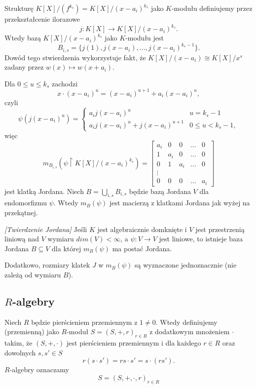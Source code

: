 Strukturę $K[X]/(f^{k_s})=K[X]/(x-a_i)^{k_s}$ jako $K$-modułu definiujemy przez przekształcenie ilorazowe
$$j:K[X]\to K[X]/(x-a_i)^{k_s}.$$
Wtedy bazą $K[X]/(x-a_i)^{k_s}$ jako $K$-modułu jest
$$B_{i,s}=\{j(1),j(x-a_i),...,j(x-a_i)^{k_s-1}\}.$$
Dowód tego stwierdzenia wykorzystuje fakt, że $K[X]/(x-a_i)\cong K[X]/x^s$ zadany przez $w(x)\mapsto w(x+a_i)$.

Dla $0\leq u\leq k_s$ zachodzi
$$x\cdot(x-a_i)^u=(x-a_i)^{u+1}+a_i(x-a_i)^u,$$
czyli
$$
\psi(j(x-a_i)^u)=\begin{cases}a_ij(x-a_i)^u & u=k_s-1\\a_ij(x-a_i)^u+j(x-a_i)^{u+1}&0\leq u < k_s-1,\end{cases}
$$
więc
$$m_{B_{i,s}}(\psi\restriction K[X]/(x-a_i)^{k_s})=\begin{bmatrix}a_i & 0 & 0 & \hdots & 0\\
    1 & a_i & 0 & \hdots & 0\\
    0 & 1 & a_i & \hdots & 0\\
    \vdots\\
  0 & 0 & 0 & \hdots & a_i\end{bmatrix}$$
  jest klatką Jordana. Niech $B=\bigcup_{i,s}B_{i,s}$ będzie bazą Jordana $V$ dla endomorfizmu $\psi$. Wtedy $m_B(\psi)$ jest macierzą z klatkami Jordana jak wyżej na przekątnej.

\begin{remark}\emph{[Twierdzenie Jordana]} Jeśli $K$ jest algebraicznie domknięte i $V$ jest przestrzenią liniową nad $V$ wymiaru $dim(V)<\infty$, a $\psi:V\to V$ jest liniowe, to istnieje baza Jordana $B\subseteq V$ dla której $m_B(\psi)$ ma postać Jordana.

  Dodatkowo, rozmiary klatek $J$ w $m_B(\psi)$ są wyznaczone jednoznacznie (nie zależą od wymiaru $B$).
\end{remark}

\subsection{$R$-algebry}

\begin{definition}
  Niech $R$ będzie pierścieniem przemiennym z $1\neq 0$. Wtedy definiujemy  (przemienną) jako $R$-moduł $S=(S,+,r)_{r\in R}$ z dodatkowym mnożeniem $\cdot$ takim, że $(S, +, \cdot)$ jest pierścieniem przemiennym i dla każdego $r\in R$ oraz dowolnych $s,s'\in S$ 
  $$r(s\cdot s')=rs\cdot s'=s\cdot(rs').$$
  $R$-algebry oznaczamy
  $$S=(S, +, \cdot, r)_{r\in R}$$
\end{definition}

